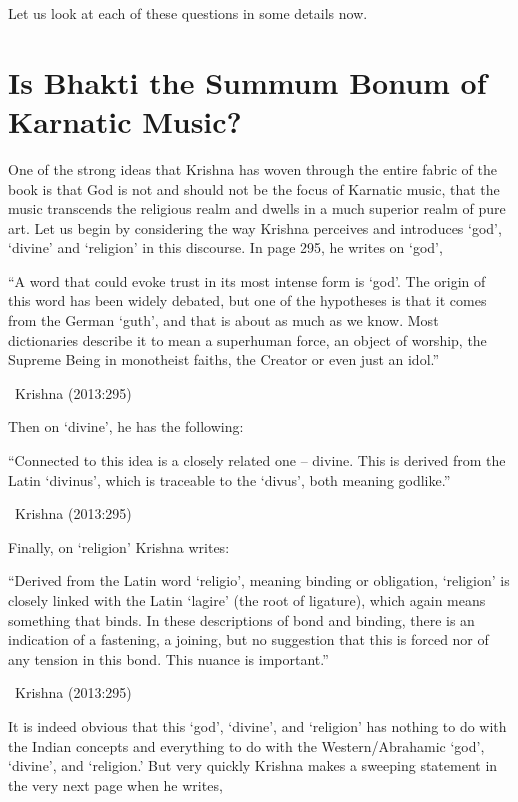 Let us look at each of these questions in some details now.


\section*{Is Bhakti the Summum Bonum of Karnatic Music?}

One of the strong ideas that Krishna has woven through the entire fabric of the book is that God is not and should not be the focus of Karnatic music, that the music transcends the religious realm and dwells in a much superior realm of pure art. Let us begin by considering the way Krishna perceives and introduces ‘god’, ‘divine’ and ‘religion’ in this discourse. In page 295, he writes on ‘god’,

\begin{myquote}
“A word that could evoke trust in its most intense form is ‘god’. The origin of this word has been widely debated, but one of the hypotheses is that it comes from the German ‘guth’, and that is about as much as we know. Most dictionaries describe it to mean a superhuman force, an object of worship, the Supreme Being in monotheist faiths, the Creator or even just an idol.” 

~\hfill Krishna (2013:295)
\end{myquote}

Then on ‘divine’, he has the following:

\begin{myquote}
“Connected to this idea is a closely related one – divine. This is derived from the Latin ‘divinus’, which is traceable to the ‘divus’, both meaning godlike.” 

~\hfill Krishna (2013:295)
\end{myquote}

Finally, on ‘religion’ Krishna writes:

\begin{myquote}
“Derived from the Latin word ‘religio’, meaning binding or obligation, ‘religion’ is closely linked with the Latin ‘lagire’ (the root of ligature), which again means something that binds. In these descriptions of bond and binding, there is an indication of a fastening, a joining, but no suggestion that this is forced nor of any tension in this bond. This nuance is important.” 

~\hfill Krishna (2013:295)
\end{myquote}

It is indeed obvious that this ‘god’, ‘divine’, and ‘religion’ has nothing to do with the Indian concepts and everything to do with the Western/Abrahamic ‘god’, ‘divine’, and ‘religion.’ But very quickly Krishna makes a sweeping statement in the very next page when he writes,

